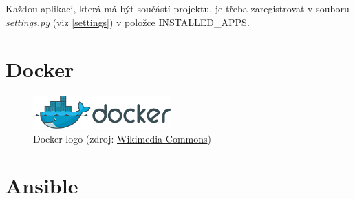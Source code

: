 Každou aplikaci, která má být součástí projektu, je třeba zaregistrovat v souboru \textit{settings.py} (viz \ref{settings}) v položce \textsf{INSTALLED\_APPS}.

\section{Docker}
\label{docker}

\begin{figure}[H] \centering
      \includegraphics[width=150pt]{./pictures/Docker_(container_engine)_logo.png}
      \caption[Docker logo]{Docker logo (zdroj:
\href{https://commons.wikimedia.org/wiki/File:Docker_(container_engine)_logo.png}{Wikimedia Commons})}
      \label{fig:docker}
  \end{figure}

\section{Ansible}
\label{ansible}  

